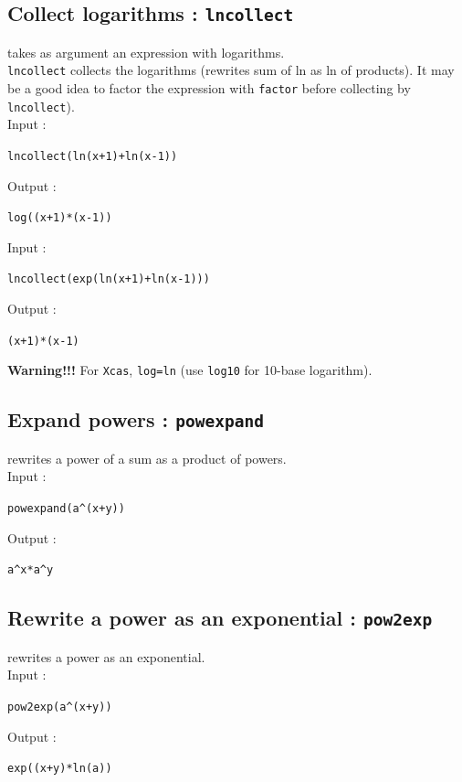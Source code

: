 \documentclass[a4paper,11pt]{book}
\begin{document}
\subsection{Collect logarithms : {\tt lncollect}}
 takes as argument an expression with logarithms.\\
{\tt lncollect} collects the logarithms (rewrites sum of ln
as ln of products). 
It may be a good idea to factor the 
expression with {\tt factor} before collecting by {\tt lncollect}).\\
Input :
\begin{center}{\tt lncollect(ln(x+1)+ln(x-1))}\end{center}
Output :
\begin{center}{\tt log((x+1)*(x-1))}\end{center}
Input :
\begin{center}{\tt lncollect(exp(ln(x+1)+ln(x-1)))}\end{center}
Output :
\begin{center}{\tt (x+1)*(x-1)}\end{center}
{\bf Warning!!!}  For {\tt Xcas}, {\tt log=ln} (use {\tt log10}
for 10-base logarithm).

\subsection{Expand powers : {\tt powexpand}}
 rewrites a power of a sum as a product of powers.\\
Input :
\begin{center}{\tt powexpand(a\verb|^|(x+y))}\end{center}
Output :
\begin{center}{\tt a\verb|^|x*a\verb|^|y}\end{center}


\subsection{Rewrite a power as an exponential : {\tt pow2exp}}
 rewrites a power as an exponential.\\
Input :
\begin{center}{\tt  pow2exp(a\verb|^|(x+y))}\end{center}
Output :
\begin{center}{\tt exp((x+y)*ln(a))}\end{center}
\end{document}

